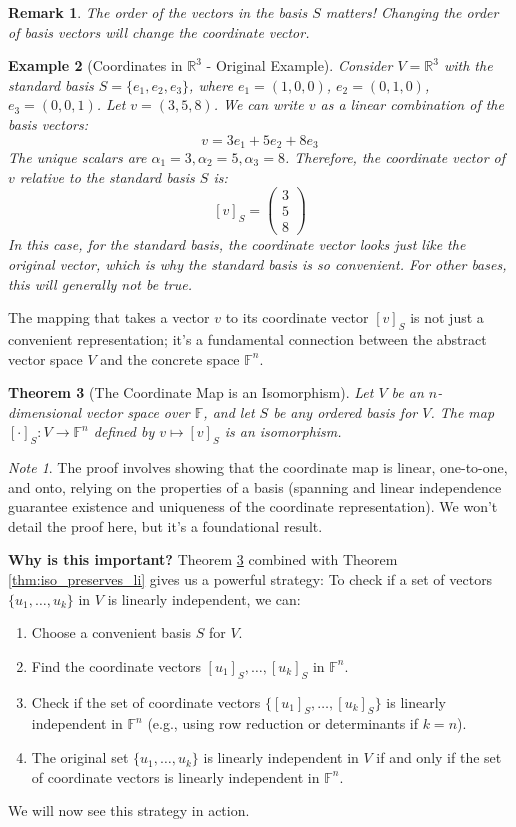 \documentclass[11pt]{article}
\newtheorem{theorem}{Theorem}[section]
\newtheorem{remark}[theorem]{Remark}
\newtheorem{example}[theorem]{Example}
\theoremstyle{definition}
\theoremstyle{remark}
\newtheorem*{note}{Note}
\newcommand{\R}{\mathbb{R}}
\newcommand{\F}{\mathbb{F}}
\newcommand{\mat}[1]{\begin{pmatrix}#1\end{pmatrix}}
\begin{document}
\begin{remark}
The order of the vectors in the basis $S$ matters! Changing the order of basis vectors will change the coordinate vector.
\end{remark}

\begin{example}[Coordinates in $\R^3$ - Original Example]
Consider $V = \R^3$ with the standard basis $S = \{e_1, e_2, e_3\}$, where $e_1=(1,0,0)$, $e_2=(0,1,0)$, $e_3=(0,0,1)$. Let $v = (3, 5, 8)$.
We can write $v$ as a linear combination of the basis vectors:
\[ v = 3 e_1 + 5 e_2 + 8 e_3 \]
The unique scalars are $\alpha_1=3, \alpha_2=5, \alpha_3=8$. Therefore, the coordinate vector of $v$ relative to the standard basis $S$ is:
\[ [v]_S = \mat{3 \\ 5 \\ 8} \]
In this case, for the standard basis, the coordinate vector looks just like the original vector, which is why the standard basis is so convenient. For other bases, this will generally not be true.
\end{example}

The mapping that takes a vector $v$ to its coordinate vector $[v]_S$ is not just a convenient representation; it's a fundamental connection between the abstract vector space $V$ and the concrete space $\F^n$.

\begin{theorem}[The Coordinate Map is an Isomorphism] \label{thm:coord_map_iso}
Let $V$ be an $n$-dimensional vector space over $\F$, and let $S$ be any ordered basis for $V$. The map $[\cdot]_S: V \to \F^n$ defined by $v \mapsto [v]_S$ is an isomorphism.
\end{theorem}

\begin{note}
The proof involves showing that the coordinate map is linear, one-to-one, and onto, relying on the properties of a basis (spanning and linear independence guarantee existence and uniqueness of the coordinate representation). We won't detail the proof here, but it's a foundational result.
\end{note}

\textbf{Why is this important?} Theorem \ref{thm:coord_map_iso} combined with Theorem \ref{thm:iso_preserves_li} gives us a powerful strategy:
To check if a set of vectors $\{u_1, \dots, u_k\}$ in $V$ is linearly independent, we can:
\begin{enumerate}
    \item Choose a convenient basis $S$ for $V$.
    \item Find the coordinate vectors $[u_1]_S, \dots, [u_k]_S$ in $\F^n$.
    \item Check if the set of coordinate vectors $\{[u_1]_S, \dots, [u_k]_S\}$ is linearly independent in $\F^n$ (e.g., using row reduction or determinants if $k=n$).
    \item The original set $\{u_1, \dots, u_k\}$ is linearly independent in $V$ if and only if the set of coordinate vectors is linearly independent in $\F^n$.
\end{enumerate}
We will now see this strategy in action.
\end{document}
